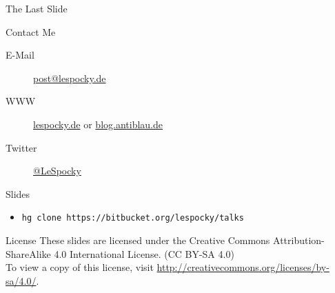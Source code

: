 \documentclass{beamer}
\begin{document}
\begin{frame}{The Last Slide}
    \begin{block}{Contact Me}
        \begin{description}
            \item [E-Mail] \href{mailto:post@lespocky.de}{post@lespocky.de}
            \item [WWW] \href{http://www.lespocky.de/}{lespocky.de} or
                    \href{http://blog.antiblau.de/}{blog.antiblau.de}
            \item [Twitter] \href{https://twitter.com/LeSpocky}{@LeSpocky}
        \end{description}
    \end{block}
    \begin{block}{Slides}
        \begin{itemize}
            \item \texttt{hg clone https://bitbucket.org/lespocky/talks}
        \end{itemize}
    \end{block}
    \begin{block}{License}
        These slides are licensed under the Creative Commons
        Attribution-ShareAlike 4.0 International License. (CC BY-SA 4.0) \\
        To view a copy of this license, visit
        \url{http://creativecommons.org/licenses/by-sa/4.0/}.
    \end{block}
\end{frame}
\end{document}
